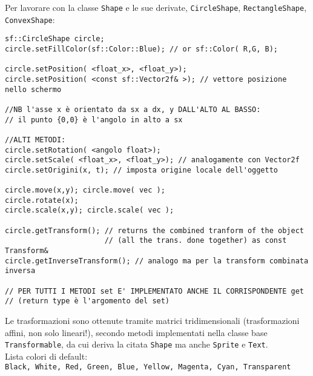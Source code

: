 \documentclass[10pt, oneside]{Book}
\begin{document}
Per lavorare con la classe \texttt{Shape} e le sue derivate, \texttt{CircleShape}, \texttt{RectangleShape}, \texttt{ConvexShape}:
\begin{verbatim}
sf::CircleShape circle;
circle.setFillColor(sf::Color::Blue); // or sf::Color( R,G, B);

circle.setPosition( <float_x>, <float_y>);
circle.setPosition( <const sf::Vector2f& >); // vettore posizione nello schermo

//NB l'asse x è orientato da sx a dx, y DALL'ALTO AL BASSO:
// il punto {0,0} è l'angolo in alto a sx

//ALTI METODI:
circle.setRotation( <angolo float>);
circle.setScale( <float_x>, <float_y>); // analogamente con Vector2f
circle.setOrigini(x, t); // imposta origine locale dell'oggetto

circle.move(x,y); circle.move( vec );
circle.rotate(x);
circle.scale(x,y); circle.scale( vec );

circle.getTransform(); // returns the combined tranform of the object
                       // (all the trans. done together) as const Transform&
circle.getInverseTransform(); // analogo ma per la transform combinata inversa

// PER TUTTI I METODI set E' IMPLEMENTATO ANCHE IL CORRISPONDENTE get 
// (return type è l'argomento del set)
\end{verbatim}
Le trasformazioni sono ottenute tramite matrici tridimensionali (trasformazioni affini, non solo lineari!), secondo metodi implementati nella classe base \texttt{Transformable}, da cui deriva la citata \texttt{Shape} ma anche \texttt{Sprite} e \texttt{Text}.
\\Lista colori di default:
\\\texttt{Black, White, Red, Green, Blue, Yellow, Magenta, Cyan, Transparent}
\\~\\ \\
\end{document}
